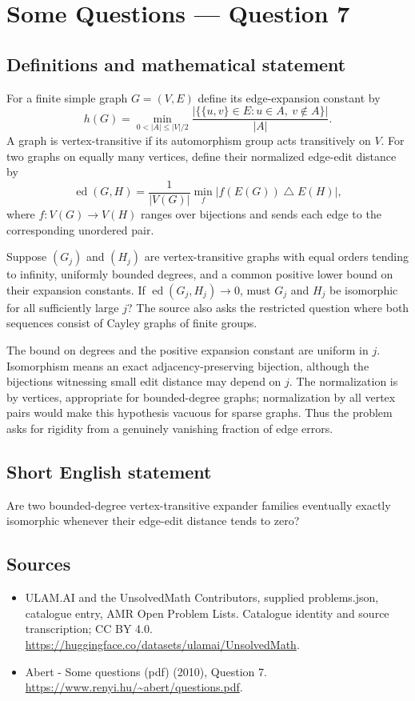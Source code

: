 \documentclass[11pt,a4paper]{article}
\begin{document}
\section*{Some Questions — Question 7}\label{statement}

\subsection{Definitions and mathematical statement}
For a finite simple graph $G=(V,E)$ define its edge-expansion constant by
\[
 h(G)=\min_{0<|A|\leq |V|/2}
       \frac{|\{\{u,v\}\in E:u\in A,\ v\notin A\}|}{|A|}.
\]
A graph is vertex-transitive if its automorphism group acts transitively on $V$. For two graphs on equally many vertices, define their normalized edge-edit distance by
\[
 \operatorname{ed}(G,H)=\frac1{|V(G)|}\min_f
                   |f(E(G))\mathbin{\triangle} E(H)|,
\]
where $f:V(G)\to V(H)$ ranges over bijections and sends each edge to the corresponding unordered pair.

Suppose $(G_j)$ and $(H_j)$ are vertex-transitive graphs with equal orders tending to infinity, uniformly bounded degrees, and a common positive lower bound on their expansion constants. If $\operatorname{ed}(G_j,H_j)\to0$, must $G_j$ and $H_j$ be isomorphic for all sufficiently large $j$? The source also asks the restricted question where both sequences consist of Cayley graphs of finite groups.

The bound on degrees and the positive expansion constant are uniform in $j$. Isomorphism means an exact adjacency-preserving bijection, although the bijections witnessing small edit distance may depend on $j$. The normalization is by vertices, appropriate for bounded-degree graphs; normalization by all vertex pairs would make this hypothesis vacuous for sparse graphs. Thus the problem asks for rigidity from a genuinely vanishing fraction of edge errors.
\subsection{Short English statement}
Are two bounded-degree vertex-transitive expander families eventually exactly isomorphic whenever their edge-edit distance tends to zero?
\subsection{Sources}
\begin{itemize}
\item[S1] ULAM.AI and the UnsolvedMath Contributors, supplied problems.json, catalogue entry, AMR Open Problem Lists. Catalogue identity and source transcription; CC BY 4.0.
\url{https://huggingface.co/datasets/ulamai/UnsolvedMath}.
\item[S2] Abert - Some questions (pdf) (2010), Question 7. 
\url{https://www.renyi.hu/~abert/questions.pdf}.
\end{itemize}
\end{document}
